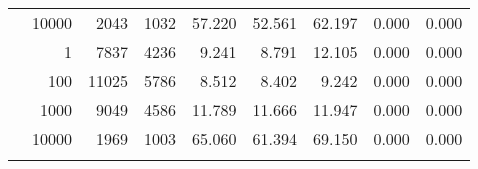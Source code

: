 \begin{table}
\begin{tabular}{rrrrrrrrr}
	            
					 &  
					 
					\multirow{ 1 }{*}{ 10000 } &
					
						
							    
							     2043  & 1032  
	                           & 57.220 & 52.561 & 62.197
	                           & 0.000 & 0.000  \\
	                
	            
	        
				\noalign{\smallskip}\hline
				\multirow{ 4 }{*}{ 500000 } &
				
					
					 
					\multirow{ 1 }{*}{ 1 } &
					
						
							    
							     7837  & 4236  
	                           & 9.241 & 8.791 & 12.105
	                           & 0.000 & 0.000  \\
	                
	            
					 &  
					 
					\multirow{ 1 }{*}{ 100 } &
					
						
							    
							     11025  & 5786  
	                           & 8.512 & 8.402 & 9.242
	                           & 0.000 & 0.000  \\
	                
	            
					 &  
					 
					\multirow{ 1 }{*}{ 1000 } &
					
						
							    
							     9049  & 4586  
	                           & 11.789 & 11.666 & 11.947
	                           & 0.000 & 0.000  \\
	                
	            
					 &  
					 
					\multirow{ 1 }{*}{ 10000 } &
					
						
							    
							     1969  & 1003  
	                           & 65.060 & 61.394 & 69.150
	                           & 0.000 & 0.000  \\
	                
	            
	        
				\noalign{\smallskip}\hline
				\multirow{ 4 }{*}{ 1000000 } &
				

\end{tabular}
\end{table}
